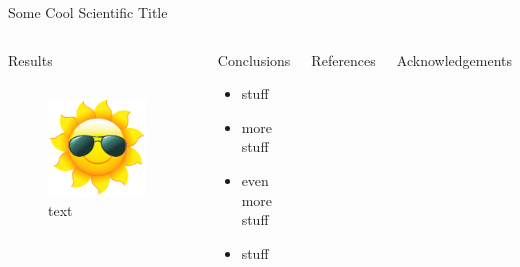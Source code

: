 \documentclass[t]{beamer}
\begin{document}
\begin{frame}[t]{Some Cool Scientific Title}
\begin{block}{}
\begin{columns}
        \begin{block}{Results}
            \begin{columns}
                \begin{figure}
                    \includegraphics[width=0.9\textwidth]{sun.png}
                    \caption{text}
                \end{figure}
                \lipsum[3]
            \end{columns}
        \end{block}


        \begin{block}{Conclusions}
            \lipsum[4]
            \begin{itemize}
                \item stuff
                \item more stuff
                \item even more stuff
                \item stuff
            \end{itemize}
        \end{block}
        \begin{block}{References}
            \lipsum[5]
        \end{block}
        \begin{block}{Acknowledgements}
            \lipsum[6]
        \end{block}
    \end{columns}
\end{block}
\end{frame}
\end{document}
